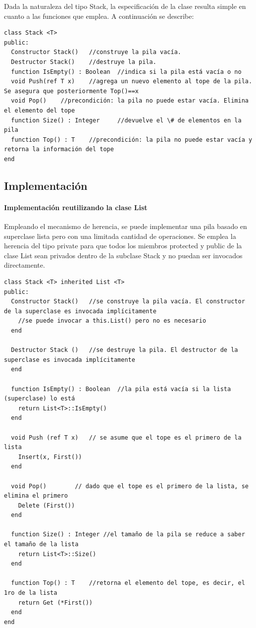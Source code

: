 Dada la naturaleza del tipo Stack, la especificación de la clase resulta simple en cuanto a las funciones que emplea. A continuación se describe:

\begin{lstlisting}[upquote=true, language=pseudo]
class Stack <T>
public:
  Constructor Stack()	//construye la pila vacía.
  Destructor Stack()	//destruye la pila.
  function IsEmpty() : Boolean	//indica si la pila está vacía o no
  void Push(ref T x)	//agrega un nuevo elemento al tope de la pila. Se asegura que posteriormente Top()==x
  void Pop()	//precondición: la pila no puede estar vacía. Elimina el elemento del tope
  function Size() : Integer		//devuelve el \# de elementos en la pila
  function Top() : T	//precondición: la pila no puede estar vacía y retorna la información del tope
end
\end{lstlisting}

\subsection{Implementación}

\paragraph{Implementación reutilizando la clase List}

Empleando el mecanismo de herencia, se puede implementar una pila basado en superclase lista pero con una
 limitada cantidad de operaciones. Se emplea la herencia del tipo private para que todos los miembros
 protected y public de la clase List sean privados dentro de la subclase Stack y no puedan ser invocados directamente. 

\begin{lstlisting}[upquote=true, language=pseudo]
class Stack <T> inherited List <T>
public:
  Constructor Stack()	//se construye la pila vacía. El constructor de la superclase es invocada implícitamente
    //se puede invocar a this.List() pero no es necesario
  end

  Destructor Stack ()	//se destruye la pila. El destructor de la superclase es invocada implícitamente
  end

  function IsEmpty() : Boolean	//la pila está vacía si la lista (superclase) lo está
    return List<T>::IsEmpty()
  end

  void Push (ref T x)	// se asume que el tope es el primero de la lista
    Insert(x, First())
  end

  void Pop()		// dado que el tope es el primero de la lista, se elimina el primero
    Delete (First())
  end

  function Size() : Integer	//el tamaño de la pila se reduce a saber el tamaño de la lista
    return List<T>::Size()
  end

  function Top() : T	//retorna el elemento del tope, es decir, el 1ro de la lista
    return Get (*First())
  end
end
\end{lstlisting}


